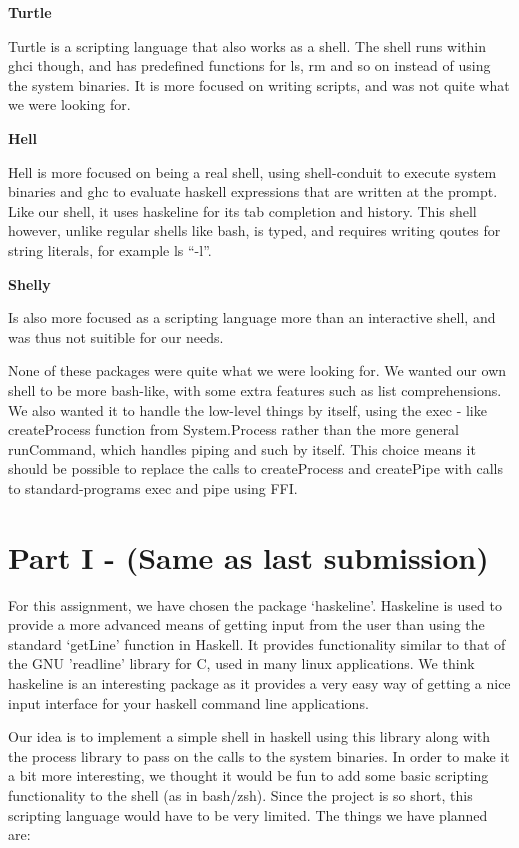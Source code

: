 \documentclass[11pt,a4paper]{article}
\begin{document}
\textbf{Turtle}

Turtle is a scripting language that also works as a shell. The shell runs
within ghci though, and has predefined functions for ls, rm and so on instead
of using the system binaries. It is more focused on writing scripts, and was
not quite what we were looking for.

\textbf{Hell}

Hell is more focused on being a real shell, using shell-conduit to execute
system binaries and ghc to evaluate haskell expressions that are written at the
prompt. Like our shell, it uses haskeline for its tab completion and history.
This shell however, unlike regular shells like bash, is typed, and requires
writing qoutes for string literals, for example ls ``-l''.

\textbf{Shelly}

Is also more focused as a scripting language more than an interactive shell,
and was thus not suitible for our needs.

None of these packages were quite what we were looking for. We wanted
our own shell to be more bash-like, with some extra features such as list
comprehensions. We also wanted it to handle the low-level things by itself,
using the exec - like createProcess function from System.Process rather than
the more general runCommand, which handles piping and such by itself. This
choice means it should be possible to replace the calls to createProcess and
createPipe with calls to standard-programs exec and pipe using FFI.








\newpage
\appendix

\section{Part I - (Same as last submission)}
For this assignment, we have chosen the package ‘haskeline’. Haskeline is used
to provide a more advanced means of getting input from the user than using the
standard ‘getLine’ function in Haskell. It provides functionality similar to
that of the GNU 'readline' library for C, used in many linux applications. We
think haskeline is an interesting package as it provides a very easy way of
getting a nice input interface for your haskell command line applications.

Our idea is to implement a simple shell in haskell using this library along with
the process library to pass on the calls to the system binaries. In order to
make it a bit more interesting, we thought it would be fun to add some basic
scripting functionality to the shell (as in bash/zsh). Since the project is so
short, this scripting language would have to be very limited. The things we have
planned are:
\end{document}
